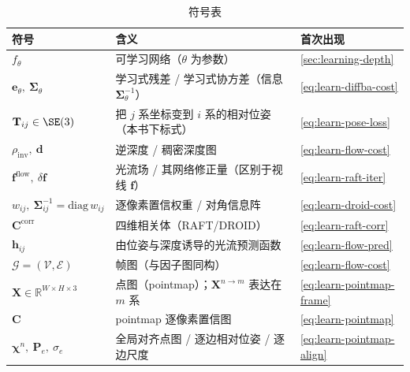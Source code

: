 \begin{table}[H]\centering\small
\caption{符号表}
\begin{tabular}{lll}
\toprule
符号 & 含义 & 首次出现 \\
\midrule
$f_\theta$ & 可学习网络（$\theta$ 为参数）& \cref{sec:learning-depth} \\
$\mathbf{e}_\theta,\ \boldsymbol\Sigma_\theta$ & 学习式残差 / 学习式协方差（信息 $\boldsymbol\Sigma_\theta^{-1}$）& \cref{eq:learn-diffba-cost} \\
$\mathbf{T}_{ij}\in\SE(3)$ & 把 $j$ 系坐标变到 $i$ 系的相对位姿（本书下标式）& \cref{eq:learn-pose-loss} \\
$\rho_{\mathrm{inv}},\ \mathbf{d}$ & 逆深度 / 稠密深度图 & \cref{eq:learn-flow-cost} \\
$\mathbf{f}^{\mathrm{flow}},\ \delta\mathbf{f}$ & 光流场 / 其网络修正量（区别于视线 $\mathbf{f}$）& \cref{eq:learn-raft-iter} \\
$w_{ij},\ \boldsymbol\Sigma_{ij}^{-1}=\mathrm{diag}\,w_{ij}$ & 逐像素置信权重 / 对角信息阵 & \cref{eq:learn-droid-cost} \\
$\mathbf{C}^{\mathrm{corr}}$ & 四维相关体（RAFT/DROID）& \cref{eq:learn-raft-corr} \\
$\mathbf{h}_{ij}$ & 由位姿与深度诱导的光流预测函数 & \cref{eq:learn-flow-pred} \\
$\mathcal{G}=(\mathcal V,\mathcal E)$ & 帧图（与因子图同构）& \cref{eq:learn-flow-cost} \\
$\mathbf{X}\in\mathbb{R}^{W\times H\times3}$ & 点图（pointmap）；$\mathbf{X}^{n\to m}$ 表达在 $m$ 系 & \cref{eq:learn-pointmap-frame} \\
$\mathbf{C}$ & pointmap 逐像素置信图 & \cref{eq:learn-pointmap} \\
$\boldsymbol\chi^n,\ \mathbf{P}_e,\ \sigma_e$ & 全局对齐点图 / 逐边相对位姿 / 逐边尺度 & \cref{eq:learn-pointmap-align} \\
\bottomrule
\end{tabular}
\end{table}

